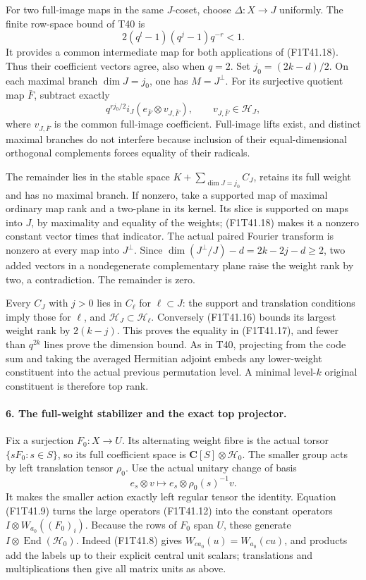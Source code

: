 For two full-image maps in the same \(J\)-coset,
choose \(\Delta:X\to J\) uniformly. The finite
row-space bound of T40 is
\[
            2(q^l-1)(q^j-1)q^{-r}<1.
 \tag{F1T41.20}
\]
It provides a common intermediate map for both
applications of (F1T41.18). Thus their coefficient
vectors agree, also when \(q=2\).
Set \(j_0=(2k-d)/2\). On each maximal branch
\(\dim J=j_0\), one has \(M=J^\perp\).
For its surjective quotient map \(\bar F\), subtract
exactly
\[
        q^{rj_0/2}i_J(e_{\bar F}\otimes v_{J,\bar F}),
                  \qquad v_{J,\bar F}\in\mathcal H_J,
 \tag{F1T41.21}
\]
where \(v_{J,\bar F}\) is the common full-image
coefficient. Full-image lifts exist, and distinct
maximal branches do not interfere because inclusion
of their equal-dimensional orthogonal complements
forces equality of their radicals.

The remainder lies in the stable space
\(K+\sum_{\dim J=j_0}C_J\), retains its full
weight and has no maximal branch. If nonzero,
take a supported map of maximal ordinary map rank
and a two-plane in its kernel. Its slice is supported
on maps into \(J\), by maximality and equality of
the weights; (F1T41.18) makes it a nonzero constant
vector times that indicator. The actual paired
Fourier transform is nonzero at every map into
\(J^\perp\). Since
\(\dim(J^\perp/J)-d=2k-2j-d\ge2\), two added
vectors in a nondegenerate complementary plane raise
the weight rank by two, a contradiction. The
remainder is zero.

Every \(C_J\) with \(j>0\) lies in \(C_\ell\)
for \(\ell\subset J\): the support and translation
conditions imply those for \(\ell\), and
\(\mathcal H_J\subset\mathcal H_\ell\).
Conversely (F1T41.16) bounds its largest weight rank
by \(2(k-j)\). This proves the equality in
(F1T41.17), and fewer than \(q^{2k}\) lines prove
the dimension bound. As in T40, projecting from
the code sum and taking the averaged Hermitian
adjoint embeds any lower-weight constituent into
the actual previous permutation level. A minimal
level-\(k\) original constituent is therefore top rank.

\paragraph{6. The full-weight stabilizer and the exact top projector.}
Fix a surjection \(F_0:X\to U\). Its alternating
weight fibre is the actual torsor \(\{sF_0:s\in S\}\),
so its full coefficient space is
\(\mathbf C[S]\otimes\mathcal H_0\).
The smaller group acts by left translation tensor
\(\rho_0\). Use the actual unitary change of basis
\[
          e_s\otimes v\longmapsto
                            e_s\otimes\rho_0(s)^{-1}v.
 \tag{F1T41.22}
\]
It makes the smaller action exactly left regular
tensor the identity. Equation (F1T41.9) turns the
large operators (F1T41.12) into the constant
operators \(I\otimes W_{a_0}((F_0)_i)\).
Because the rows of \(F_0\) span \(U\), these
generate \(I\otimes\operatorname{End}(\mathcal H_0)\).
Indeed (F1T41.8) gives
\(W_{c a_0}(u)=W_{a_0}(cu)\), and products
add the labels up to their explicit central unit
scalars; translations and multiplications then
give all matrix units as above.


